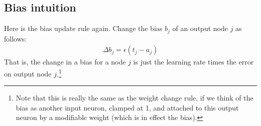 %
%
%
%


\subsection{Bias intuition}

Here is the bias update rule again. Change the bias $b_j$ of an output node $j$ as follows: 
\begin{eqnarray*}
\Delta b_j  =  \epsilon (t_j - a_j)
\end{eqnarray*}
That is, the change in a bias for a node $j$ is just the learning rate times the error on output node $j$.\footnote{Note that this is really the same as the weight change rule, if we think of the bias as another input neuron, clamped at 1, and attached to this output neuron by a modifiable weight (which is in effect the bias).}

